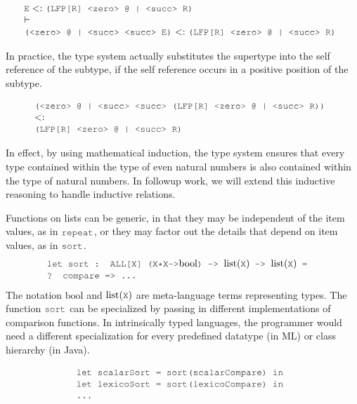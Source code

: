 \documentclass[acmsmall]{acmart}
\theoremstyle{definition}
\begin{document}
\[
  \begin{array}[t]{@{} l}
    \J{E} \subtypes \J{(LFP[R] <zero> @ | <succ> R)}
    \\
    \entails
    \\
    \J{(<zero> @ | <succ> <succ> E)} \subtypes \J{(LFP[R] <zero> @ | <succ> R)}
  \end{array}
\]

\noindent
In practice, the type system actually substitutes the supertype into
the self reference of the subtype, if the self reference occurs in a positive position of the subtype.

\[
  \begin{array}[t]{@{} l}
    \J{(<zero> @ | <succ> <succ> (LFP[R] <zero> @ | <succ> R))} 
    \\
    \subtypes 
    \\
    \J{(LFP[R] <zero> @ | <succ> R)}
  \end{array}
\]

\noindent
In effect, by using mathematical induction, the type system ensures that 
every type contained within the type of even natural numbers is also
contained within the type of natural numbers.
In followup work, we will extend this inductive reasoning to handle inductive relations. 

Functions on lists can be generic, in that they may be independent of the item values, as in $\J{repeat}$,
or they may factor out the details that depend on item values, as in $\J{sort}$. 
\[
  \begin{array}[t]{@{} l}
    \J{let sort : ALL[X] (X*X->} \text{bool} \J{) -> }\text{list}(\J{X}) \J{ -> } \text{list}(\J{X}) \J{ = }
    \\
    \J{? compare => ...}
  \end{array}
\]
\noindent
The notation $\text{bool}$ and $\text{list}(\J{X})$ are meta-language terms representing types.
The function $\J{sort}$ can be specialized by passing in different implementations of comparison functions.
In intrinsically typed languages, the programmer would need a different specialization for every predefined
datatype (in ML) or class hierarchy (in Java). 

\[
  \begin{array}[t]{@{} l}
    \J{let scalarSort = sort(scalarCompare) in}
    \\
    \J{let lexicoSort = sort(lexicoCompare) in} 
    \\
    \J{...} 
  \end{array}
\]
\end{document}
